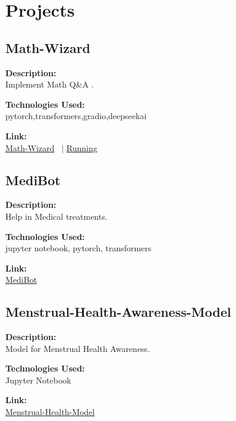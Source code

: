 \documentclass[a4paper,10pt]{article}
\begin{document}
\section{Projects}

\subsection*{Math-Wizard}

\noindent
\begin{minipage}[t]{0.4\textwidth}
  \textbf{Description:}\\
  Implement Math Q\&A .
\end{minipage}%
\begin{minipage}[t]{0.4\textwidth}
  \textbf{Technologies Used:}\\
  pytorch,transformers,gradio,deepseekai
\end{minipage}%
\begin{minipage}[t]{0.2\textwidth}
  \textbf{Link:}\\
  \href{https://github.com/aditya26062003/Math-Wizard}{Math-Wizard} \ $|$
  \href{https://huggingface.co/spaces/adi2606/Math_Wizard}{Running}
\end{minipage}

\subsection*{MediBot}

\noindent
\begin{minipage}[t]{0.4\textwidth}
  \textbf{Description:}\\
  Help in Medical treatments.
\end{minipage}%
\begin{minipage}[t]{0.4\textwidth}
  \textbf{Technologies Used:}\\
  jupyter notebook, pytorch, transformers
\end{minipage}%
\begin{minipage}[t]{0.2\textwidth}
  \textbf{Link:}\\
  \href{https://github.com/aditya26062003/MediBot}{MediBot}
\end{minipage}

\subsection*{Menstrual-Health-Awareness-Model}

\noindent
\begin{minipage}[t]{0.4\textwidth}
  \textbf{Description:}\\
  Model for Menstrual Health Awareness.
\end{minipage}%
\begin{minipage}[t]{0.4\textwidth}
  \textbf{Technologies Used:}\\
  Jupyter Notebook
\end{minipage}%
\begin{minipage}[t]{0.2\textwidth}
  \textbf{Link:}\\
  \href{https://huggingface.co/adi2606/Menstrual-Health-Awareness-Chatbot}{Menstrual-Health-Model}
\end{minipage}
\end{document}
